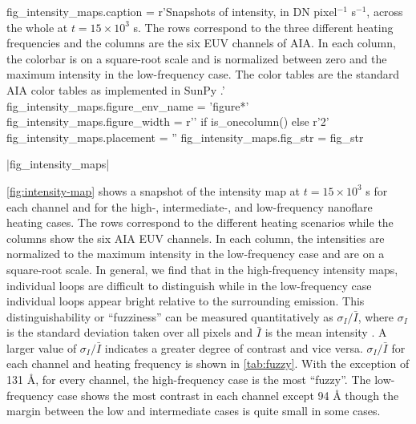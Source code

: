 \begin{pycode}
fig_intensity_maps.caption = r'Snapshots of intensity, in DN pixel$^{-1}$ s$^{-1}$, across the whole \AR{} at $t=15\times10^3$ s. The rows correspond to the three different heating frequencies and the columns are the six EUV channels of AIA. In each column, the colorbar is on a square-root scale and is normalized between zero and the maximum intensity in the low-frequency case. The color tables are the standard AIA color tables as implemented in SunPy \citep{sunpy_community_sunpypython_2015}.'
fig_intensity_maps.figure_env_name = 'figure*'
fig_intensity_maps.figure_width = r'\columnwidth' if is_onecolumn() else r'2\columnwidth'
fig_intensity_maps.placement = ''
fig_intensity_maps.fig_str = fig_str
\end{pycode}
|fig_intensity_maps|

\autoref{fig:intensity-map} shows a snapshot of the intensity map at $t=15\times10^3$ s for each channel and for the high-, intermediate-, and low-frequency nanoflare heating cases. The rows correspond to the different heating scenarios while the columns show the six AIA EUV channels. In each column, the intensities are normalized to the maximum intensity in the low-frequency case and are on a square-root scale. In general, we find that in the high-frequency intensity maps, individual loops are difficult to distinguish while in the low-frequency case individual loops appear bright relative to the surrounding emission. This distinguishability or ``fuzziness'' can be measured quantitatively as $\sigma_{I}/\bar{I}$, where $\sigma_{I}$ is the standard deviation taken over all pixels and $\bar{I}$ is the mean intensity \citep[Equation 11]{guarrasi_coronal_2010}. A larger value of $\sigma_{I}/\bar{I}$ indicates a greater degree of contrast and vice versa. $\sigma_{I}/\bar{I}$ for each channel and heating frequency is shown in \autoref{tab:fuzzy}. With the exception of 131 \AA{}, for every channel, the high-frequency case is the most ``fuzzy''. The low-frequency case shows the most contrast in each channel except 94 \AA{} though the margin between the low and intermediate cases is quite small in some cases.

